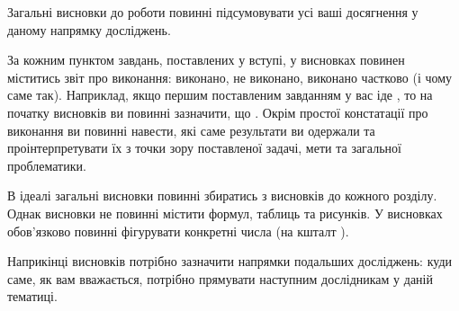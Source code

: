 Загальні висновки до роботи повинні підсумовувати усі ваші досягнення у 
даному напрямку досліджень.

За кожним пунктом завдань, поставлених у вступі, у висновках повинен 
міститись звіт про виконання: виконано, не виконано, виконано частково (і 
чому саме так). Наприклад, якщо першим поставленим завданням у вас іде 
, то на початку висновків ви 
повинні зазначити, що . Окрім 
простої констатації про виконання ви повинні навести, які саме результати 
ви одержали та проінтерпретувати їх з точки зору поставленої задачі, мети 
та загальної проблематики.

В ідеалі загальні висновки повинні збиратись з висновків до кожного 
розділу. Однак висновки не повинні містити 
формул, таблиць та рисунків. У висновках обов'язково повинні фігурувати конкретні числа
(на кшталт ).

Наприкінці висновків потрібно зазначити напрямки подальших досліджень: 
куди саме, як вам вважається, потрібно прямувати наступним дослідникам у 
даній тематиці.
